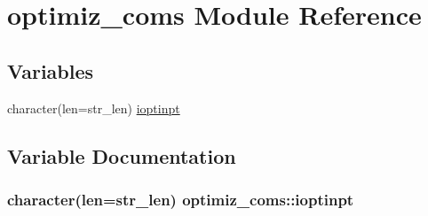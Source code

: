\hypertarget{namespaceoptimiz__coms}{}\section{optimiz\+\_\+coms Module Reference}
\label{namespaceoptimiz__coms}
\subsection*{Variables}
\begin{DoxyCompactItemize}
\item 
character(len=str\+\_\+len) \hyperlink{namespaceoptimiz__coms_a237b5bc7b92d46fc8943bc78fa9a3b5f}{ioptinpt}
\end{DoxyCompactItemize}


\subsection{Variable Documentation}
\hypertarget{namespaceoptimiz__coms_a237b5bc7b92d46fc8943bc78fa9a3b5f}{}
\subsubsection[{ioptinpt}]{\setlength{\rightskip}{0pt plus 5cm}character(len=str\+\_\+len) optimiz\+\_\+coms\+::ioptinpt}\label{namespaceoptimiz__coms_a237b5bc7b92d46fc8943bc78fa9a3b5f}
